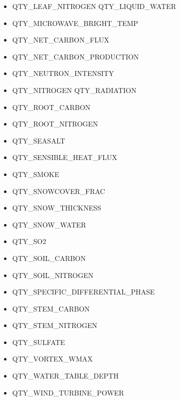 \documentclass[letterpaper,10pt,english]{sphinxmanual}
\begin{document}
\begin{itemize}
\begin{itemize}
\item {} 
QTY\_LEAF\_NITROGEN QTY\_LIQUID\_WATER

\item {} 
QTY\_MICROWAVE\_BRIGHT\_TEMP

\item {} 
QTY\_NET\_CARBON\_FLUX

\item {} 
QTY\_NET\_CARBON\_PRODUCTION

\item {} 
QTY\_NEUTRON\_INTENSITY

\item {} 
QTY\_NITROGEN QTY\_RADIATION

\item {} 
QTY\_ROOT\_CARBON

\item {} 
QTY\_ROOT\_NITROGEN

\item {} 
QTY\_SEASALT

\item {} 
QTY\_SENSIBLE\_HEAT\_FLUX

\item {} 
QTY\_SMOKE

\item {} 
QTY\_SNOWCOVER\_FRAC

\item {} 
QTY\_SNOW\_THICKNESS

\item {} 
QTY\_SNOW\_WATER

\item {} 
QTY\_SO2

\item {} 
QTY\_SOIL\_CARBON

\item {} 
QTY\_SOIL\_NITROGEN

\item {} 
QTY\_SPECIFIC\_DIFFERENTIAL\_PHASE

\item {} 
QTY\_STEM\_CARBON

\item {} 
QTY\_STEM\_NITROGEN

\item {} 
QTY\_SULFATE

\item {} 
QTY\_VORTEX\_WMAX

\item {} 
QTY\_WATER\_TABLE\_DEPTH

\item {} 
QTY\_WIND\_TURBINE\_POWER


\end{itemize}
\end{itemize}
\end{document}
